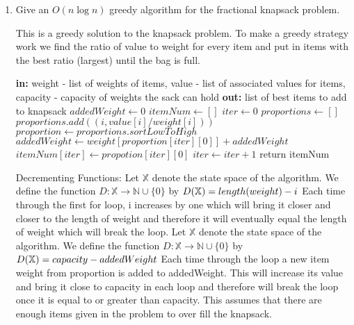 \documentclass{article}
\newcommand{\N}{\mathbb{N}}
\begin{document}
\begin{enumerate}
    \item Give an $O(n\log n)$ greedy algorithm for the fractional knapsack problem.
    \newline\newline
    
    This is a greedy solution to the knapsack problem. To make a greedy strategy work we find the ratio of value to weight for every item and put in items with the best ratio (largest) until the bag is full.
    \begin{algorithm}
    \begin{algorithmic}
    \newline
    	\textbf{in: } weight - list of weights of items, value - list of associated values for items, capacity - capacity of weights the sack can hold\newline
	\textbf{out: } list of best items to add to knapsack
	\State $addedWeight \gets 0$
	\State $itemNum \gets []$
	\State $iter \gets 0$
	\State $proportions \gets []$
		\State $proportions.add((i, value[i]/weight[i])) $
	\EndFor
	\State $proportion \gets proportions.sortLowToHigh$
		\State $addedWeight \gets weight[proportion[iter][0]] + addedWeight$
		\State $itemNum[iter] \gets propotion[iter][0]$ 
		\State $iter \gets iter + 1$
	\EndWhile
	\State return itemNum
    \EndProcedure
    \end{algorithmic}
    \end{algorithm}
    \newline
    Decrementing Functions: \newline
     Let $\mathbb{X}$ denote the state space of the algorithm. We define the function $D \colon \mathbb{X} \to \N \cup \{0\}$ by $D( \mathbb{X}) = length(weight) -i\newline $
   Each time through the first for loop, i increases by one which will bring it closer and closer to the length of weight and therefore it will eventually equal the length of weight which will break the loop.
 Let $\mathbb{X}$ denote the state space of the algorithm. We define the function $D \colon \mathbb{X} \to \N \cup \{0\}$ by $D( \mathbb{X}) = capacity - addedWeight\newline $
 Each time through the loop a new item weight from proportion is added to addedWeight. This will increase its value and bring it close to capacity in each loop and therefore will break the loop once it is equal to or greater than capacity. This assumes that there are enough items given in the problem to over fill the knapsack.
 

\end{enumerate}
\end{document}
